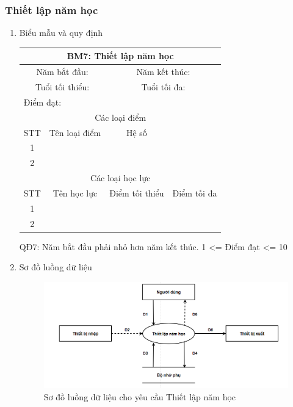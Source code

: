 \documentclass[a4paper]{article}
\begin{document}
		\subsubsection{Thiết lập năm học}	
\begin{enumerate}
\item Biểu mẫu và quy định

\begin{table}[H]
\centering
\renewcommand{\arraystretch}{1.5}
\setlength{\tabcolsep}{15pt}
\begin{tabular}{|c|c|c|c|}
\hline
\multicolumn{4}{|c|}{\textbf{BM7: Thiết lập năm học}} \\
\hline
\multicolumn{2}{|p{5cm}|}{Năm bắt đầu: \dotfill}  & \multicolumn{2}{|p{5cm}|}{Năm kết thúc: \dotfill}  \\
\hline
\multicolumn{2}{|p{5cm}|}{Tuổi tối thiểu: \dotfill}  & \multicolumn{2}{|p{5cm}|}{Tuổi tối đa: \dotfill}  \\
\hline
\multicolumn{4}{|l|}{Điểm đạt: \dotfill} \\
\hline
\multicolumn{4}{|c|}{Các loại điểm} \\
\hline
STT & Tên loại điểm & Hệ số & \\
\hline 
1 & & & \\
\hline
2 & & & \\
\hline
\multicolumn{4}{|c|}{Các loại học lực} \\
\hline
STT & Tên học lực & Điểm tối thiểu & Điểm tối đa \\ 
\hline
1 & & & \\
\hline
2 & & & \\
\hline

\end{tabular}
\end{table}

QĐ7: Năm bắt đầu phải nhỏ hơn năm kết thúc. 1 <= Điểm đạt <= 10


\item Sơ đồ luồng dữ liệu
\begin{figure}[H] 
    \centering
    \includegraphics[width=1\textwidth]{dfd7} %
    \caption{Sơ đồ luồng dữ liệu cho yêu cầu Thiết lập năm học}
\end{figure}


\end{enumerate}
\end{document}
